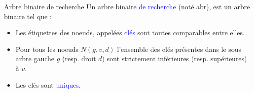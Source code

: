 \documentclass[10pt]{beamer}
\begin{document}
\begin{frame}[fragile]{\Ctitle}{\stitle}
	\begin{alertblock}{Arbre binaire de recherche}
		Un arbre binaire \textcolor{blue}{de recherche} (noté {\sc abr}), est un arbre binaire tel que :
		\begin{itemize}
			\item<2-> Les étiquettes des noeuds, appelées \textcolor{blue}{clés} sont toutes comparables entre elles. \\
				\onslide<4->{\textcolor{gray}{Par exemple, les étiquettes sont toutes des nombres ou encore des chaines de caractères (comparées par ordre alphabétique).}}
			\item<5-> Pour tous les noeuds $N(g,v,d)$ l'ensemble des clés présentes dans le sous arbre gauche $g$ (resp. droit $d$) sont strictement inférieures (resp. supérieures) à $v$.\\
				\item<6->{Les clés sont \textcolor{blue}{uniques}.}
		\end{itemize}
	\end{alertblock}
\end{frame}
\end{document}
